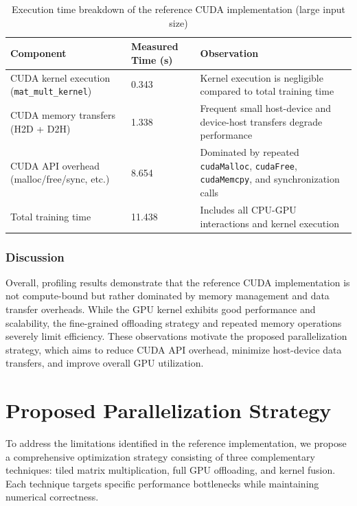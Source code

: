 \documentclass[conference, 12pt]{IEEEtran}
\begin{document}
\begin{table}[H]
\centering
\caption{Execution time breakdown of the reference CUDA implementation (large input size)}
\label{tab:profiling_large}
\begin{tabular}{|p{2.5cm}|p{2cm}|p{3cm}|}
\hline
\textbf{Component} & \textbf{Measured Time (s)} & \textbf{Observation} \\
\hline
CUDA kernel execution (\texttt{mat\_mult\_kernel}) & 0.343 & Kernel execution is negligible compared to total training time \\
\hline
CUDA memory transfers (H2D + D2H) & 1.338 & Frequent small host-device and device-host transfers degrade performance \\
\hline
CUDA API overhead (malloc/free/sync, etc.) & 8.654 & Dominated by repeated \texttt{cudaMalloc}, \texttt{cudaFree}, \texttt{cudaMemcpy}, and synchronization calls \\
\hline
Total training time & 11.438 & Includes all CPU-GPU interactions and kernel execution \\
\hline
\end{tabular}
\end{table}



\subsubsection{Discussion}

Overall, profiling results demonstrate that the reference CUDA implementation is not compute-bound but rather dominated by memory management and data transfer overheads. While the GPU kernel exhibits good performance and scalability, the fine-grained offloading strategy and repeated memory operations severely limit efficiency. These observations motivate the proposed parallelization strategy, which aims to reduce CUDA API overhead, minimize host-device data transfers, and improve overall GPU utilization.


\section{Proposed Parallelization Strategy}
To address the limitations identified in the reference implementation, we propose a comprehensive optimization strategy consisting of three complementary techniques: tiled matrix multiplication, full GPU offloading, and kernel fusion. Each technique targets specific performance bottlenecks while maintaining numerical correctness.
\end{document}
